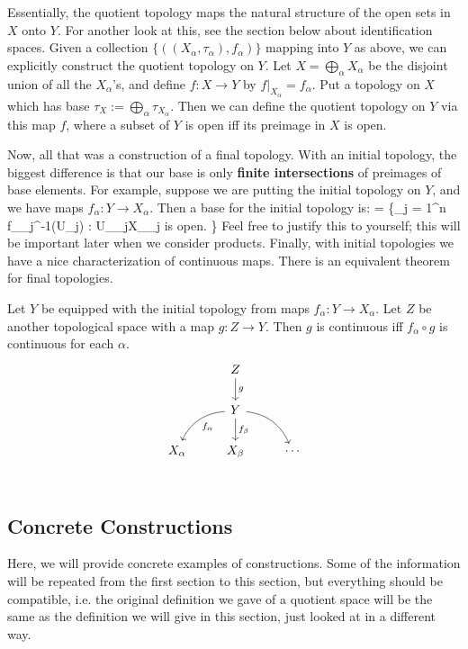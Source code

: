 	Essentially, the quotient topology maps the natural structure of the open sets in $X$ onto $Y$. For another look at this, 
	see the section below about identification spaces. Given a collection $\{((X_\alpha, \tau_\alpha), f_\alpha)\}$ mapping into 
	$Y$ as above, we can explicitly construct the quotient topology on $Y$. Let $X = \bigoplus_\alpha X_\alpha$ be the 
	disjoint union of all the $X_\alpha$'s, and define $f : X\rightarrow Y$ by $f|_{X_\alpha} = f_\alpha$. Put a topology on $X$ 
	which has base $\tau_X := \bigoplus_\alpha \tau_{X_\alpha}$. Then we can define the quotient topology on $Y$ via this 
	map $f$, where a subset of $Y$ is open iff its preimage in $X$ is open. 
	
	Now, all that was a construction of a final topology. With an initial topology, the biggest difference is that our base is only 
	\textbf{finite intersections} of preimages of base elements. For example, suppose we are putting the initial topology on 
	$Y$, and we have maps $f_\alpha : Y\rightarrow X_\alpha$. Then a base for the initial topology is:
	\eq
		\beta = \left\{\bigcap_{j = 1}^n f_{\alpha_j}^{-1}(U_j) : U_{\alpha_j}\subseteq X_{\alpha_j}\textnormal{ is open.} \right\}
	\qe
	Feel free to justify this to yourself; this will be important later when we consider products. Finally, with initial topologies we 
	have a nice characterization of continuous maps. There is an equivalent theorem for final topologies.
	
	\begin{prop}
		Let $Y$ be equipped with the initial topology from maps $f_\alpha : Y\rightarrow X_\alpha$. Let $Z$ be another 
		topological space with a map $g : Z\rightarrow Y$. Then $g$ is continuous iff $f_\alpha\circ g$ is continuous for each 
		$\alpha$.
		\[
		\begin{tikzcd}
			{} & Z \arrow[d, "g"] & {} \\
			{} & Y \arrow[ld, bend right, "f_\alpha"] \arrow[d, "f_\beta"] \arrow[rd, bend left] & {} \\
			X_\alpha & X_\beta & \cdots \\
		\end{tikzcd}
		\]
	\end{prop}	
	
	\subsection{Concrete Constructions}

	Here, we will provide concrete examples of constructions. Some of the information will be repeated from the first section to this section, but everything should 
	be compatible, i.e. the original definition we gave of a quotient space will be the same as the definition we will give in this section, just looked at in a different 
	way. 
	
